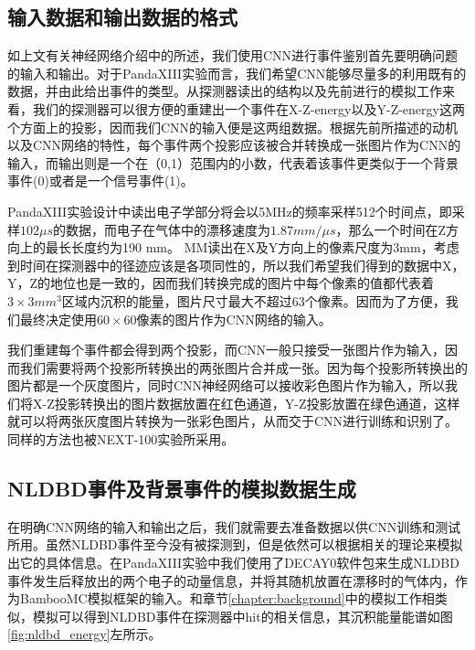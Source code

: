 \subsection{输入数据和输出数据的格式}
如上文有关神经网络介绍中的所述，我们使用CNN进行事件鉴别首先要明确问题的输入和输出。对于PandaXIII实验而言，我们希望CNN能够尽量多的利用既有的数据，并由此给出事件的类型。从探测器读出的结构以及先前进行的模拟工作来看，我们的探测器可以很方便的重建出一个事件在X-Z-energy以及Y-Z-energy这两个方面上的投影，因而我们CNN的输入便是这两组数据。根据先前所描述的动机以及CNN网络的特性，每个事件两个投影应该被合并转换成一张图片作为CNN的输入，而输出则是一个在（0,1）范围内的小数，代表着该事件更类似于一个背景事件(0)或者是一个信号事件(1)。

PandaXIII实验设计中读出电子学部分将会以5MHz的频率采样512个时间点，即采样$102\mu s$的数据，而电子在气体中的漂移速度为$1.87 mm/ \mu s$，那么一个时间在Z方向上的最长长度约为190 mm。 MM读出在X及Y方向上的像素尺度为3mm，考虑到时间在探测器中的径迹应该是各项同性的，所以我们希望我们得到的数据中X，Y，Z的地位也是一致的，因而我们转换完成的图片中每个像素的值都代表着$3\times 3mm^3$区域内沉积的能量，图片尺寸最大不超过63个像素。因而为了方便，我们最终决定使用$60\times60$像素的图片作为CNN网络的输入。

我们重建每个事件都会得到两个投影，而CNN一般只接受一张图片作为输入，因而我们需要将两个投影所转换出的两张图片合并成一张。因为每个投影所转换出的图片都是一个灰度图片，同时CNN神经网络可以接收彩色图片作为输入，所以我们将X-Z投影转换出的图片数据放置在红色通道，Y-Z投影放置在绿色通道，这样就可以将两张灰度图片转换为一张彩色图片，从而交于CNN进行训练和识别了。同样的方法也被NEXT-100实验所采用\supercite{renner2017background}。

\subsection{NLDBD事件及背景事件的模拟数据生成}

在明确CNN网络的输入和输出之后，我们就需要去准备数据以供CNN训练和测试所用。虽然NLDBD事件至今没有被探测到，但是依然可以根据相关的理论来模拟出它的具体信息。在PandaXIII实验中我们使用了DECAY0软件包\supercite{ponkratenko2000event}来生成NLDBD事件发生后释放出的两个电子的动量信息，并将其随机放置在漂移时的气体内，作为BambooMC模拟框架的输入。和章节\ref{chapter:background}中的模拟工作相类似，模拟可以得到NLDBD事件在探测器中hit的相关信息，其沉积能量能谱如图\ref{fig:nldbd_energy}左所示。

